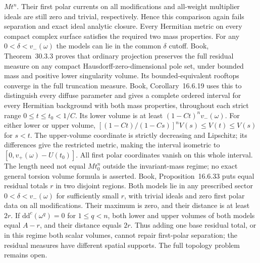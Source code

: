 \documentclass[11pt]{article}
\newcommand{\ddc}{\mathrm d\mathrm d^c}
\begin{document}
$Mt^n$. Their first polar currents on all modifications and all-weight multiplier ideals are still zero and trivial, respectively. Hence this comparison again fails separation and exact ideal analytic closure. Every Hermitian metric on every compact complex surface satisfies the required two mass properties. For any $0<\delta<v_-(\omega)$ the models can lie in the common $\delta$ cutoff. Book, Theorem~30.3.3 proves that ordinary projection preserves the full residual measure on any compact Hausdorff-zero-dimensional pole set, under bounded mass and positive lower singularity volume. Its bounded-equivalent rooftops converge in the full truncation measure. Book, Corollary~16.6.19 uses this to distinguish every diffuse parameter and gives a complete ordered interval for every Hermitian background with both mass properties, throughout each strict range $0\leq t\leq t_0<1/C$. Its lower volume is at least $(1-Ct)^nv_-(\omega)$. For either lower or upper volume, $[(1-Ct)/(1-Cs)]^nV(s)\leq V(t)\leq V(s)$ for $s<t$. The upper-volume coordinate is strictly decreasing and Lipschitz; its differences give the restricted metric, making the interval isometric to $[0,v_+(\omega)-U(t_0)]$. All first polar coordinates vanish on this whole interval. The length need not equal $Mt_0^n$ outside the invariant-mass regime; no exact general torsion volume formula is asserted. Book, Proposition~16.6.33 puts equal residual totals $r$ in two disjoint regions. Both models lie in any prescribed sector $0<\delta<v_-(\omega)$ for sufficiently small $r$, with trivial ideals and zero first polar data on all modifications. Their maximum is zero, and their distance is at least $2r$. If $\ddc(\omega^q)=0$ for $1\leq q<n$, both lower and upper volumes of both models equal $A-r$, and their distance equals $2r$. Thus adding one base residual total, or in this regime both scalar volumes, cannot repair first-polar separation; the residual measures have different spatial supports. The full topology problem remains open.
\end{document}
